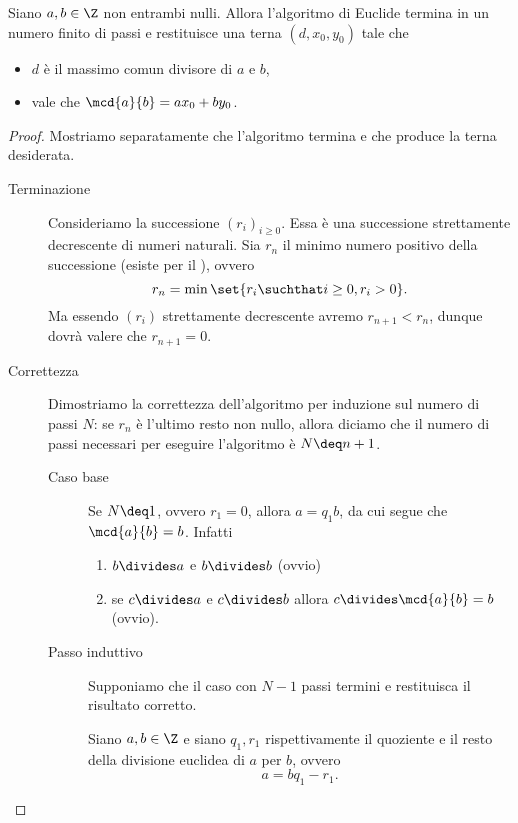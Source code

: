 \begin{theorem}
    Siano $a, b \in \Z$ non entrambi nulli. Allora l'algoritmo di Euclide termina in un numero finito di passi e restituisce una terna $(d, x_0, y_0)$ tale che \begin{itemize}
        \item $d$ è il massimo comun divisore di $a$ e $b$,
        \item vale che $\mcd{a}{b} = ax_0 + by_0$.
    \end{itemize}
\end{theorem}
\begin{proof}
    Mostriamo separatamente che l'algoritmo termina e che produce la terna desiderata.
    \begin{description}
        \item[Terminazione] Consideriamo la successione $(r_i)_{i\geq 0}$. Essa è una successione strettamente decrescente di numeri naturali. Sia $r_n$ il minimo numero positivo della successione (esiste per il ), ovvero \[
            r_n = \min \set{r_i \suchthat i \geq 0, r_i > 0}.    
        \] Ma essendo $(r_i)$ strettamente decrescente avremo $r_{n+1} < r_n$, dunque dovrà valere che $r_{n+1} = 0$.
        \item[Correttezza] Dimostriamo la correttezza dell'algoritmo per induzione sul numero di passi $N$: se $r_n$ è l'ultimo resto non nullo, allora diciamo che il numero di passi necessari per eseguire l'algoritmo è $N \deq n+1$. 
        \begin{description}
            \item[Caso base] Se $N \deq 1$, ovvero $r_1 = 0$, allora $a = q_1b$, da cui segue che $\mcd{a}{b} = b$. Infatti
            \begin{enumerate}[label={\roman*}]
                \item $b \divides a$ e $b \divides b$ (ovvio)
                \item se $c \divides a$ e $c \divides b$ allora $c \divides \mcd{a}{b} = b$ (ovvio).
            \end{enumerate} 
            \item[Passo induttivo] Supponiamo che il caso con $N - 1$ passi termini e restituisca il risultato corretto.
            
            Siano $a, b \in \Z$ e siano $q_1, r_1$ rispettivamente il quoziente e il resto della divisione euclidea di $a$ per $b$, ovvero \[
                a = bq_1 - r_1.    
            \]
            

\end{description}
\end{description}
\end{proof}

